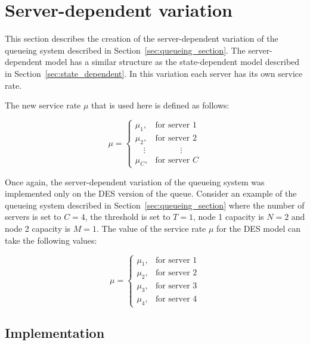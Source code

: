 \section{Server-dependent variation}\label{sec:server_dependent}

This section describes the creation of the server-dependent variation of the
queueing system described in Section~\ref{sec:queueing_section}.
The server-dependent model has a similar structure as the state-dependent model
described in Section~\ref{sec:state_dependent}.
In this variation each server has its own service rate.

The new service rate \(\mu\) that is used here is defined as follows:

\begin{equation}\label{eq:server_dependent_service_rate}
    \mu =
    \begin{cases}
        \mu_1, & \text{for server } 1 \\
        \mu_2, & \text{for server } 2 \\
        \quad \vdots & \qquad \quad \vdots \\
        \mu_C, & \text{for server } C
    \end{cases}
\end{equation}

Once again, the server-dependent variation of the queueing system was
implemented only on the DES version of the queue.
Consider an example of the queueing system described in
Section~\ref{sec:queueing_section} where the number of servers is set to
\(C = 4\), the threshold is set to \(T = 1\), node 1 capacity is \(N = 2\) and
node 2 capacity is \(M = 1\).
The value of the service rate \(\mu\) for the DES model can take the following
values:

\begin{equation*}
    \mu =
    \begin{cases}
        \mu_1, & \text{for server } 1 \\
        \mu_2, & \text{for server } 2 \\
        \mu_3, & \text{for server } 3 \\
        \mu_4, & \text{for server } 4
    \end{cases}
\end{equation*}



\subsection{Implementation}

